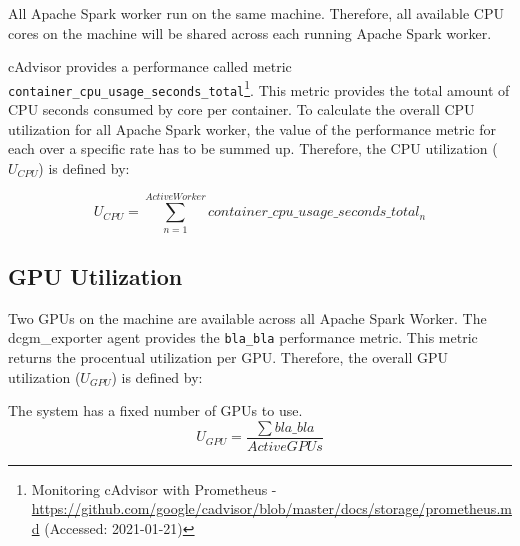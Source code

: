 
All Apache Spark worker run on the same machine. Therefore, all available CPU cores on the machine will be shared across each running Apache Spark worker.


cAdvisor provides a performance called metric \texttt{container\_cpu\_usage\_seconds\_total}\footnote{Monitoring cAdvisor with Prometheus - \url{https://github.com/google/cadvisor/blob/master/docs/storage/prometheus.md} (Accessed: 2021-01-21)}. This metric provides the total amount of CPU seconds consumed by core per container. 
To calculate the overall CPU utilization for all Apache Spark worker, the value of the performance metric for each over a specific rate has to be summed up. Therefore, the CPU utilization ($U_{CPU}$) is defined by:

\begin{equation}
U_{CPU}=\sum_{n=1}^{ActiveWorker}container\_cpu\_usage\_seconds\_total_{n}
\label{eq:formel}
\end{equation}

\subsection{GPU Utilization}
Two GPUs on the machine are available across all Apache Spark Worker.
The dcgm\_exporter agent provides the \texttt{bla\_bla} performance metric. This metric returns the procentual utilization per GPU.
Therefore, the overall GPU utilization ($U_{GPU}$) is defined by:


The system has a fixed number of GPUs to use.
\begin{equation}
U_{GPU} = \dfrac{\sum bla\_bla}{ActiveGPUs}
\label{eq:formel}
\end{equation}


